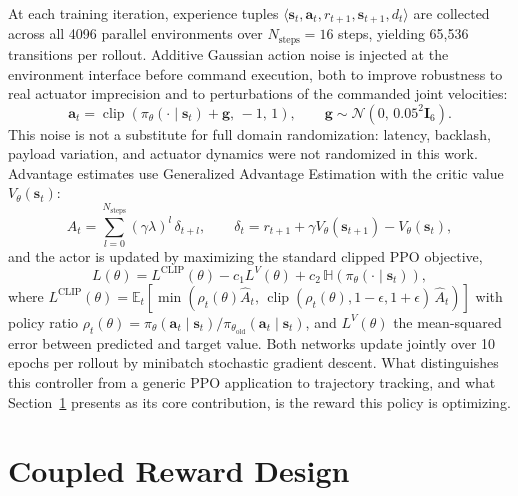 At each training iteration, experience tuples $\langle \mathbf{s}_t, \mathbf{a}_t, r_{t+1},
\mathbf{s}_{t+1}, d_t \rangle$ are collected across all 4096 parallel environments over
$N_{\text{steps}} = 16$ steps, yielding 65{,}536 transitions per rollout. Additive Gaussian action
noise is injected at the environment interface before command execution, both to improve robustness
to real actuator imprecision and to perturbations of the commanded joint velocities:
\begin{equation}
\mathbf{a}_t = \operatorname{clip}\left( \pi_\theta(\cdot \mid \mathbf{s}_t) + \mathbf{g},\, -1,\, 1 \right),
\qquad \mathbf{g} \sim \mathcal{N}(0,\, 0.05^2 \mathbf{I}_6).
\label{eq:dikppo_actionnoise}
\end{equation}
This noise is not a substitute for full domain randomization: latency, backlash, payload variation,
and actuator dynamics were not randomized in this work. Advantage estimates use Generalized Advantage
Estimation with the critic value $V_\theta(\mathbf{s}_t)$:
\begin{equation}
\hat{A}_t = \sum_{l=0}^{N_{\text{steps}}} (\gamma \lambda)^l\, \delta_{t+l}, \qquad
\delta_t = r_{t+1} + \gamma V_\theta(\mathbf{s}_{t+1}) - V_\theta(\mathbf{s}_t),
\label{eq:dikppo_gae}
\end{equation}
and the actor is updated by maximizing the standard clipped PPO objective,
\begin{equation}
L(\theta) = L^{\text{CLIP}}(\theta) - c_1 L^V(\theta) + c_2\, \mathbb{H}\!\left( \pi_\theta(\cdot \mid \mathbf{s}_t) \right),
\label{eq:dikppo_ppoloss}
\end{equation}
where $L^{\text{CLIP}}(\theta) = \mathbb{E}_t\!\left[ \min\!\left( \rho_t(\theta) \hat{A}_t,\,
\operatorname{clip}(\rho_t(\theta), 1-\epsilon, 1+\epsilon)\, \hat{A}_t \right) \right]$ with policy
ratio $\rho_t(\theta) = \pi_\theta(\mathbf{a}_t \mid \mathbf{s}_t) /
\pi_{\theta_{\text{old}}}(\mathbf{a}_t \mid \mathbf{s}_t)$, and $L^V(\theta)$ the mean-squared error
between predicted and target value. Both networks update jointly over 10 epochs per rollout by
minibatch stochastic gradient descent. What distinguishes this controller from a generic PPO
application to trajectory tracking, and what Section~\ref{sec:dikppo_reward} presents as its core
contribution, is the reward this policy is optimizing.

\section{Coupled Reward Design}\label{sec:dikppo_reward}

